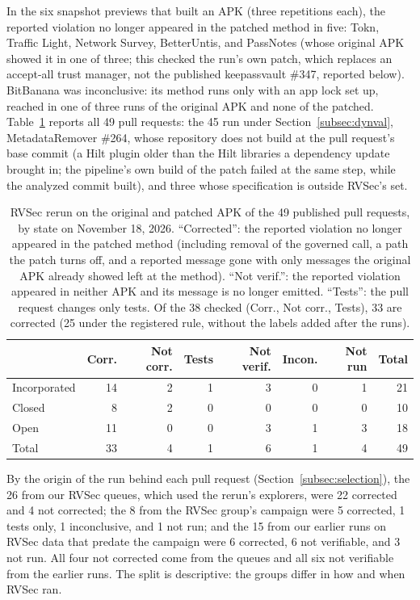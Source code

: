 \documentclass[conference]{IEEEtran}
\begin{document}
In the six snapshot previews that built an APK (three repetitions each), the
reported violation no longer appeared in the patched method in five: Tokn,
Traffic Light, Network Survey, BetterUntis, and PassNotes (whose original APK
showed it in one of three; this checked the run's own patch, which replaces an
accept-all trust manager, not the published keepassvault \#347, reported
below). BitBanana was inconclusive: its method runs only with an app lock set
up, reached in one of three runs of the original APK and none of the patched.
Table~\ref{tab:dynval} reports all 49 pull requests: the 45 run under
Section~\ref{subsec:dynval}, MetadataRemover \#264, whose repository does not
build at the pull request's base commit (a Hilt plugin older than the Hilt
libraries a dependency update brought in; the pipeline's own build of the
patch failed at the same step, while the analyzed commit built), and three whose specification is outside RVSec's
set.

\begin{table}[H]
\centering
\caption{RVSec rerun on the original and patched APK of the 49 published pull
requests, by state on November 18, 2026. ``Corrected'': the reported violation
no longer appeared in the patched method (including removal of the governed
call, a path the patch turns off, and a reported message gone with only
messages the original APK already showed left at the method). ``Not verif.'':
the reported violation appeared in neither APK and its message is no longer
emitted. ``Tests'': the pull request changes only tests. Of the 38 checked (Corr., Not corr., Tests),
33 are corrected (25 under the registered rule, without the labels added after the runs).}
\label{tab:dynval}
\footnotesize
\setlength{\tabcolsep}{3pt}
\begin{tabular}{lrrrrrrr}
\toprule
 & Corr. & Not corr. & Tests & Not verif. & Incon. & Not run & Total \\
\midrule
Incorporated & 14 & 2 & 1 & 3 & 0 & 1 & 21 \\
Closed       & 8 & 2 & 0 & 0 & 0 & 0 & 10 \\
Open         & 11 & 0 & 0 & 3 & 1 & 3 & 18 \\
\midrule
Total        & 33 & 4 & 1 & 6 & 1 & 4 & 49 \\
\bottomrule
\end{tabular}
\end{table}

By the origin of the run behind each pull request
(Section~\ref{subsec:selection}), the 26 from our RVSec queues, which used the
rerun's explorers, were 22 corrected and 4 not corrected; the 8 from the RVSec
group's campaign were 5 corrected, 1 tests only, 1 inconclusive, and 1 not run;
and the 15 from our earlier runs on RVSec data that predate the campaign were 6
corrected, 6 not verifiable, and 3 not run. All four not corrected come from
the queues and all six not verifiable from the earlier runs. The split is
descriptive: the groups differ in how and when RVSec ran.
\end{document}
